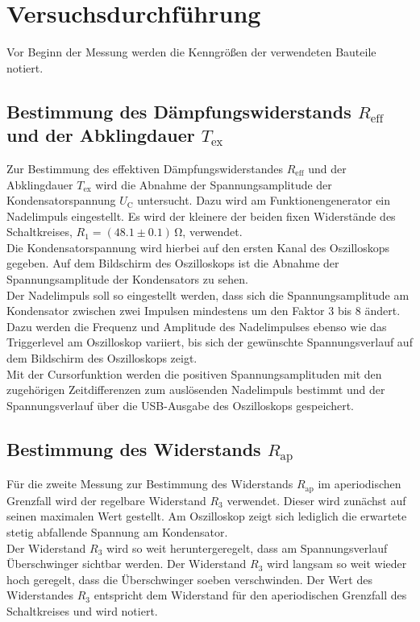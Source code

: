 


\section{Versuchsdurchführung}
\label{sec:Versuchsbeschreibung}

Vor Beginn der Messung werden die Kenngrößen der verwendeten Bauteile notiert.

\subsection{Bestimmung des Dämpfungswiderstands $R_{\mathrm{eff}}$ und der Abklingdauer $T_{\mathrm{ex}}$}
Zur Bestimmung des effektiven Dämpfungswiderstandes $R_\mathrm{eff}$ und der Abklingdauer $T_\text{ex}$ wird die Abnahme der Spannungsamplitude der Kondensatorspannung $U_\text{C}$ untersucht.
Dazu wird am Funktionengenerator ein Nadelimpuls eingestellt.
Es wird der kleinere der beiden fixen Widerstände des Schaltkreises, $R_\text{1}=(48.1 \pm 0.1)\,\si{\ohm}$, verwendet. \\
Die Kondensatorspannung wird hierbei auf den ersten Kanal des Oszilloskops gegeben.
Auf dem Bildschirm des Oszilloskops ist die Abnahme der Spannungsamplitude der Kondensators zu sehen.\\
Der Nadelimpuls soll so eingestellt werden, dass sich die Spannungsamplitude am Kondensator zwischen zwei Impulsen mindestens um den Faktor 3 bis 8 ändert.
Dazu werden die Frequenz und Amplitude des Nadelimpulses ebenso wie das Triggerlevel am Oszilloskop variiert, bis sich der gewünschte Spannungsverlauf auf dem Bildschirm des Oszilloskops zeigt.\\
Mit der Cursorfunktion werden die positiven Spannungsamplituden mit den zugehörigen Zeitdifferenzen zum auslösenden Nadelimpuls bestimmt und der Spannungsverlauf über die USB-Ausgabe des Oszilloskops gespeichert.

\subsection{Bestimmung des Widerstands $R_{\mathrm{ap}}$}
Für die zweite Messung zur Bestimmung des Widerstands $R_\text{ap}$ im aperiodischen Grenzfall wird der regelbare Widerstand $R_\text{3}$ verwendet.
Dieser wird zunächst auf seinen maximalen Wert gestellt. Am Oszilloskop zeigt sich lediglich die erwartete stetig abfallende Spannung am Kondensator. \\
Der Widerstand $R_\text{3}$ wird so weit heruntergeregelt, dass am Spannungsverlauf Überschwinger sichtbar werden.
Der Widerstand $R_\text{3}$ wird langsam so weit wieder hoch geregelt, dass die Überschwinger soeben verschwinden. Der Wert des Widerstandes $R_\text{3}$ entspricht dem Widerstand für den aperiodischen Grenzfall des Schaltkreises und wird notiert.

